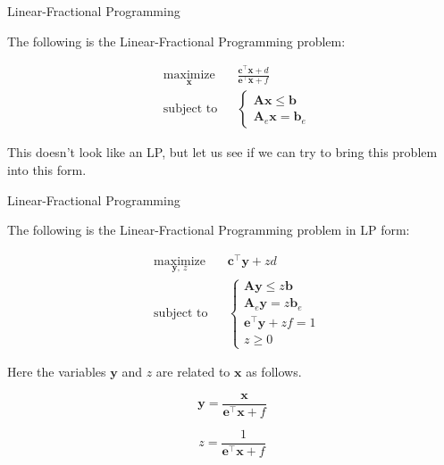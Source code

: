 \documentclass{beamer}
\begin{document}
\begin{frame}{Linear-Fractional Programming}
	\begin{flushleft}
		
		The following is the Linear-Fractional Programming problem:
		
		\begin{equation}
			\begin{aligned}
				& \underset{\mathbf{x}}{\text{maximize}}
				& & \frac{\mathbf{c}^\top \mathbf{x} + d}{\mathbf{e}^\top \mathbf{x} + f} \\
				& \text{subject to}
				& & 
				 \begin{cases}
				 	\mathbf{A} \mathbf{x} \leq \mathbf{b} \\
				 	\mathbf{A}_e \mathbf{x} = \mathbf{b}_e
				 \end{cases}
			\end{aligned}
		\end{equation}
		
		This doesn't look like an LP, but let us see if we can try to bring this problem into this form. 
		
	\end{flushleft}
\end{frame}



\begin{frame}{Linear-Fractional Programming}
	\begin{flushleft}
		
		The following is the Linear-Fractional Programming problem in LP form:
		
		\begin{equation}
			\begin{aligned}
				& \underset{\mathbf{y}, \ z}{\text{maximize}}
				& & \mathbf{c}^\top \mathbf{y} + z d \\
				& \text{subject to}
				& & 
				\begin{cases}
					\mathbf{A} \mathbf{y} \leq z \mathbf{b} \\
					\mathbf{A}_e \mathbf{y} = z \mathbf{b}_e \\
					\mathbf{e}^\top \mathbf{y} + z f = 1 \\
					z \geq 0
				\end{cases}
			\end{aligned}
		\end{equation}
		
		Here the variables $\mathbf{y}$ and $z$ are related to $\mathbf{x}$ as follows.
		
		\begin{equation}
			\mathbf{y} = \frac{\mathbf{x}}{\mathbf{e}^\top \mathbf{x} + f}
		\end{equation}
	 
		\begin{equation}
			z = \frac{1}{\mathbf{e}^\top \mathbf{x} + f}
		\end{equation} 
		
	\end{flushleft}
\end{frame}
\end{document}
